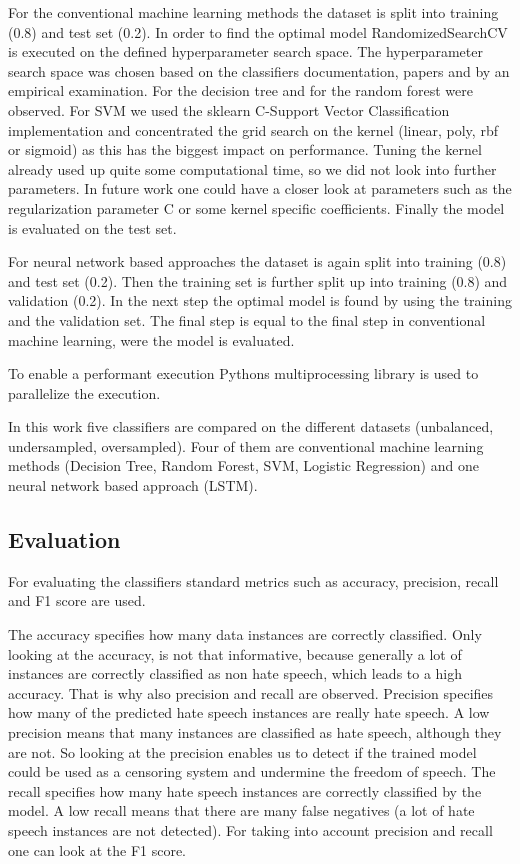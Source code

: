 For the conventional machine learning methods the dataset is split into training (0.8) and test set (0.2). In order to find the optimal model Randomized\-SearchCV is executed on the defined hyperparameter search space. The hyperparameter search space was chosen based on the classifiers doc\-u\-men\-ta\-tion, papers and by an empirical examination. For the decision tree \cite{mantovani2019empirical} and for the random forest \cite{probstHyperparametersTuningStrategies2019} were observed. For SVM we used the sklearn C-Support Vector Classification implementation and concentrated the grid search on the kernel (linear, poly, rbf or sigmoid) as this has the biggest impact on performance. Tuning the kernel already used up quite some computational time, so we did not look into further parameters. In future work one could have a closer look at parameters such as the regularization parameter C or some kernel specific coefficients.
Finally the model is evaluated on the test set.


For neural network based approaches the dataset is again split into training (0.8) and test set (0.2). Then the training set is further split up into training (0.8) and validation (0.2). In the next step the optimal model is found by using the training and the validation set. The final step is equal to the final step in conventional machine learning, were the model is evaluated.

To enable a performant execution Pythons multiprocessing library is used to parallelize the execution.

In this work five classifiers are compared on the different datasets (unbalanced, undersampled, oversampled). Four of them are conventional machine learning methods (Decision Tree, Random Forest, SVM, Logistic Regression) and one neural network based approach (LSTM).

\subsection{Evaluation}
\label{ch:approachE}

For evaluating the classifiers standard metrics such as accuracy, precision, recall and F1 score are used.

The accuracy specifies how many data instances are correctly classified. Only looking at the accuracy, is not that informative, because generally a lot of instances are correctly classified as non hate speech, which leads to a high accuracy. That is why also precision and recall are observed. Precision specifies how many of the predicted hate speech instances are really hate speech. A low precision means that many instances are classified as hate speech, although they are not. So looking at the precision enables us to detect if the trained model could be used as a censoring system and undermine the freedom of speech. The recall specifies how many hate speech instances are correctly classified by the model. A low recall means that there are many false negatives (a lot of hate speech instances are not detected). For taking into account precision and recall one can look at the F1 score.

